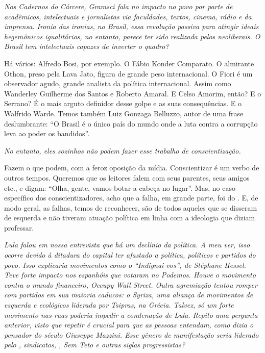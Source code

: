 \itshape
 Nos \emph{Cadernos do Cárcere}, Gramsci fala no impacto
no povo por parte de acadêmicos, intelectuais e jornalistas via
faculdades, textos, cinema, rádio e da imprensa. Ironia das ironias, no
Brasil, essa revolução passiva para atingir ideais hegemônicos
igualitários, no entanto, parece ter sido realizada pelos neoliberais. O
Brasil tem intelectuais capazes de inverter o quadro?

\normalfont 
Há vários: Alfredo Bosi, por exemplo. O Fábio Konder
Comparato. O almirante Othon, preso pela Lava Jato, figura de grande
peso internacional. O Fiori é um observador agudo, grande analista da
política internacional. Assim como Wanderley Guilherme dos Santos e
Roberto Amaral. E Celso Amorim, então? E o Serrano? É o mais arguto
definidor desse golpe e as suas consequências. E o Walfrido Warde. Temos
também Luiz Gonzaga Belluzzo, autor de uma frase deslumbrante: ``O
Brasil é o único país do mundo onde a luta contra a corrupção leva ao
poder os bandidos''.

\itshape
 No entanto, eles sozinhos não podem fazer esse trabalho
de conscientização.

\normalfont 
Fazem o que podem, com a feroz oposição da mídia.
Conscientizar é um verbo de outros tempos. Queremos que os leitores
falem com seus parentes, seus amigos etc., e digam: ``Olha, gente, vamos
botar a cabeça no lugar''. Mas, no caso específico dos
conscientizadores, acho que a falha, em grande parte, foi do . E, de
modo geral, as falhas, temos de reconhecer, são de todos aqueles que se
disseram de esquerda e não tiveram atuação política em linha com a
ideologia que diziam professar.

\itshape
 Lula falou em nossa entrevista que há um declínio da
política. A meu ver, isso ocorre devido à ditadura do capital ter
afastado a política, políticos e partidos do povo. Isso explicaria
movimentos como o ``Indignai-vos'', de Stéphane Hessel. Teve forte
impacto nos espanhóis que votaram no Podemos. Houve o movimento contra o
mundo financeiro, Occupy Wall Street. Outra agremiação tentou romper com
partidos em sua maioria caducos: o Syriza, uma aliança de movimentos de
esquerda e ecológicos liderada por Tsipras, na Grécia. Talvez, só um
forte movimento nas ruas poderia impedir a condenação de Lula. Repito
uma pergunta anterior, visto que repetir é crucial para que as pessoas
entendam, como dizia o pensador do século  Giuseppe Mazzini. Esse
gênero de manifestação seria liderado pelo , sindicatos, , Sem Teto
e outras siglas progressistas?

